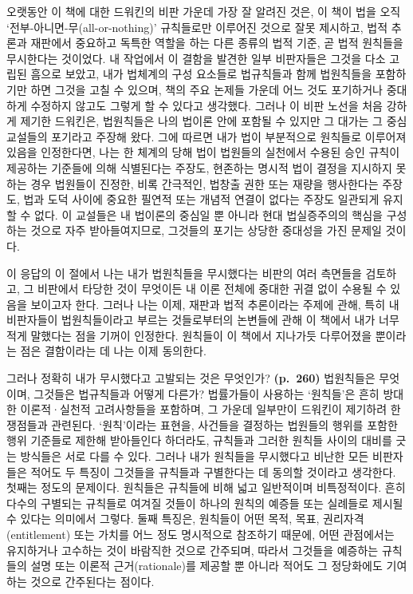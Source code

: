 오랫동안 이 책에 대한 드워킨의 비판 가운데 가장 잘 알려진 것은, 이 책이
법을 오직 ‘전부-아니면-무(all-or-nothing)’ 규칙들로만 이루어진 것으로
잘못 제시하고, 법적 추론과 재판에서 중요하고 독특한 역할을 하는 다른
종류의 법적 기준, 곧 법적 원칙들을 무시한다는 것이었다. 내 작업에서 이
결함을 발견한 일부 비판자들은 그것을 다소 고립된 흠으로 보았고, 내가
법체계의 구성 요소들로 법규칙들과 함께 법원칙들을 포함하기만 하면 그것을
고칠 수 있으며, 책의 주요 논제들 가운데 어느 것도 포기하거나 중대하게
수정하지 않고도 그렇게 할 수 있다고 생각했다. 그러나 이 비판 노선을 처음
강하게 제기한 드워킨은, 법원칙들은 나의 법이론 안에 포함될 수 있지만 그
대가는 그 중심 교설들의 포기라고 주장해 왔다. 그에 따르면 내가 법이
부분적으로 원칙들로 이루어져 있음을 인정한다면, 나는 한 체계의 당해 법이
법원들의 실천에서 수용된 승인 규칙이 제공하는 기준들에 의해 식별된다는
주장도, 현존하는 명시적 법이 결정을 지시하지 못하는 경우 법원들이
진정한, 비록 간극적인, 법창출 권한 또는 재량을 행사한다는 주장도, 법과
도덕 사이에 중요한 필연적 또는 개념적 연결이 없다는 주장도 일관되게
유지할 수 없다. 이 교설들은 내 법이론의 중심일 뿐 아니라 현대
법실증주의의 핵심을 구성하는 것으로 자주 받아들여지므로, 그것들의 포기는
상당한 중대성을 가진 문제일 것이다.

이 응답의 이 절에서 나는 내가 법원칙들을 무시했다는 비판의 여러 측면들을
검토하고, 그 비판에서 타당한 것이 무엇이든 내 이론 전체에 중대한 귀결
없이 수용될 수 있음을 보이고자 한다. 그러나 나는 이제, 재판과 법적
추론이라는 주제에 관해, 특히 내 비판자들이 법원칙들이라고 부르는
것들로부터의 논변들에 관해 이 책에서 내가 너무 적게 말했다는 점을 기꺼이
인정한다. 원칙들이 이 책에서 지나가듯 다루어졌을 뿐이라는 점은
결함이라는 데 나는 이제 동의한다.

그러나 정확히 내가 무시했다고 고발되는 것은 무엇인가? \textbf{(p.~260)}
법원칙들은 무엇이며, 그것들은 법규칙들과 어떻게 다른가? 법률가들이
사용하는 ‘원칙들’은 흔히 방대한 이론적·실천적 고려사항들을 포함하며, 그
가운데 일부만이 드워킨이 제기하려 한 쟁점들과 관련된다. ‘원칙’이라는
표현을, 사건들을 결정하는 법원들의 행위를 포함한 행위 기준들로 제한해
받아들인다 하더라도, 규칙들과 그러한 원칙들 사이의 대비를 긋는 방식들은
서로 다를 수 있다. 그러나 내가 원칙들을 무시했다고 비난한 모든
비판자들은 적어도 두 특징이 그것들을 규칙들과 구별한다는 데 동의할
것이라고 생각한다. 첫째는 정도의 문제이다. 원칙들은 규칙들에 비해 넓고
일반적이며 비특정적이다. 흔히 다수의 구별되는 규칙들로 여겨질 것들이
하나의 원칙의 예증들 또는 실례들로 제시될 수 있다는 의미에서 그렇다.
둘째 특징은, 원칙들이 어떤 목적, 목표, 권리자격(entitlement) 또는 가치를
어느 정도 명시적으로 참조하기 때문에, 어떤 관점에서는 유지하거나
고수하는 것이 바람직한 것으로 간주되며, 따라서 그것들을 예증하는
규칙들의 설명 또는 이론적 근거(rationale)를 제공할 뿐 아니라 적어도 그
정당화에도 기여하는 것으로 간주된다는 점이다.

